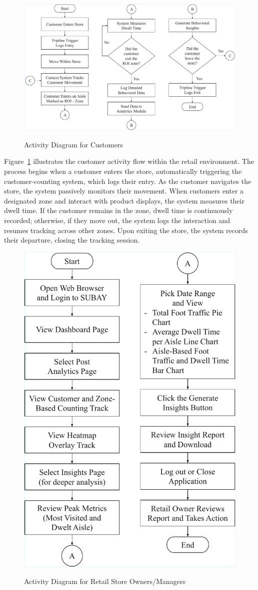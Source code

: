 {\begin{figure}[H]
	\caption[Activity Diagram for Customers]{\newline \newline Activity Diagram for Customers}
	\centering
	\includegraphics[width=0.75\linewidth]{fig/3.10.pdf}
	\label{fig:3.10}
\end{figure}

Figure~\ref{fig:3.10} illustrates the customer activity flow within the retail environment. The process begins when a customer enters the store, automatically triggering the customer-counting system, which logs their entry. As the customer navigates the store, the system passively monitors their movement. When customers enter a designated zone and interact with product displays, the system measures their dwell time. If the customer remains in the zone, dwell time is continuously recorded; otherwise, if they move out, the system logs the interaction and resumes tracking across other zones. Upon exiting the store, the system records their departure, closing the tracking session.

\begin{figure}[H]
	\caption[ Activity Diagram for Retail Store Owners/Managers]{\newline \newline Activity Diagram for Retail Store Owners/Managers}
	\centering
	\includegraphics[width=0.40\linewidth]{fig/3.11.pdf}
	\label{fig:3.11}
\end{figure}

}
